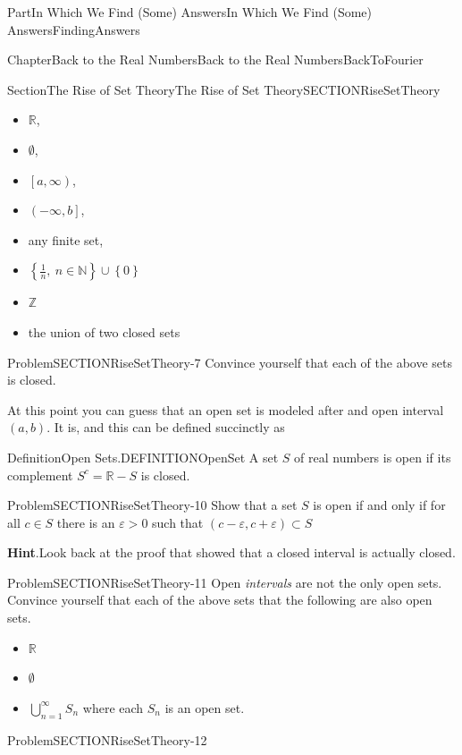 \documentclass[oneside,10pt,]{book}
\newcommand{\blocktitlefont}{\relax}
\numberwithin{equation}{part}
\newcommand{\eps}{\varepsilon}
\newcommand{\RR}{\mathbb {R}}
\newcommand{\ZZ}{\mathbb {Z}}
\begin{document}
\begin{partptx}{Part}{In Which We Find (Some) Answers}{}{In Which We Find (Some) Answers}{}{}{FindingAnswers}
\begin{chapterptx}{Chapter}{Back to the Real Numbers}{}{Back to the Real Numbers}{}{}{BackToFourier}
\begin{sectionptx}{Section}{The Rise of Set Theory}{}{The Rise of Set Theory}{}{}{SECTIONRiseSetTheory}
\begin{multicols}{2}
\begin{itemize}[label=\textbullet]
\item{}\(\RR\),%
\item{}\(\emptyset\),%
\item{}\(\left[a,\infty \right)\),%
\item{}\(\left(-\infty ,b\right]\),%
\item{}any finite set,%
\item{}\(\displaystyle \left\{\frac{1}{n},\ n\in \mathbb{N}\right\}\cup
\left\{0\right\}\)%
\item{}\(\displaystyle \ZZ\)%
\item{}the union of two closed sets%
\end{itemize}
\end{multicols}
%
\begin{problem}{Problem}{}{SECTIONRiseSetTheory-7}%
Convince yourself that each of the above sets is closed.%
\end{problem}
At this point you can guess that an open set is modeled after and open interval \((a,b)\).  It is, and this can be defined succinctly as%
\begin{definition}{Definition}{Open Sets.}{DEFINITIONOpenSet}%
A set \(S\) of real numbers is open if its complement \(S^c=\RR-S\) is closed.%
\end{definition}
\begin{problem}{Problem}{}{SECTIONRiseSetTheory-10}%
Show that a set \(S\) is open if and only if for all \(c\in S\) there is an \(\eps >0\) such that \(\left(c-\eps ,c+\eps \right)\subset S\)%
\par\smallskip%
\noindent\textbf{\blocktitlefont Hint}.\hypertarget{SECTIONRiseSetTheory-10-2}{}\quad{}Look back at the proof that showed that a closed interval is actually closed.%
\end{problem}
\begin{problem}{Problem}{}{SECTIONRiseSetTheory-11}%
Open \emph{intervals} are not the only open sets. Convince yourself that each of the above sets that the following are also open sets.%
\begin{itemize}[label=\textbullet]
\item{}\(\displaystyle \RR \)%
\item{}\(\displaystyle \emptyset\)%
\item{}\(\bigcup^{\infty }_{n=1}{S_n}\) where each \(S_n\) is an open set.%
\end{itemize}
%
\end{problem}
\begin{problem}{Problem}{}{SECTIONRiseSetTheory-12}%

\end{problem}
\end{sectionptx}
\end{chapterptx}
\end{partptx}
\end{document}
